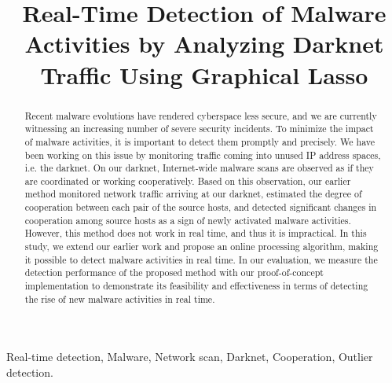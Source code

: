 \documentclass[conference]{IEEEtran}
\begin{document}
\title{
  Real-Time Detection of Malware Activities by Analyzing Darknet Traffic Using Graphical Lasso
}

\author{
}


\maketitle

\begin{abstract}
Recent malware evolutions have rendered cyberspace less secure, and we are currently witnessing an increasing number of severe security incidents.
To minimize the impact of malware activities, it is important to detect them promptly and precisely.
We have been working on this issue by monitoring traffic coming into unused IP address spaces, i.e. the darknet.
On our darknet, Internet-wide malware scans are observed as if they are coordinated or working cooperatively.
Based on this observation, our earlier method monitored network traffic arriving at our darknet, estimated the degree of cooperation between each pair of the source hosts, and detected significant changes in cooperation among source hosts as a sign of newly activated malware activities.
However, this method does not work in real time, and thus it is impractical.
In this study, we extend our earlier work and propose an online processing algorithm, making it possible to detect malware activities in real time.
In our evaluation, we measure the detection performance of the proposed method with our proof-of-concept implementation to demonstrate its feasibility and effectiveness in terms of detecting the rise of new malware activities in real time.
\end{abstract}

\begin{IEEEkeywords}
Real-time detection, Malware, Network scan, Darknet, Cooperation, Outlier detection.
\end{IEEEkeywords}
\end{document}
